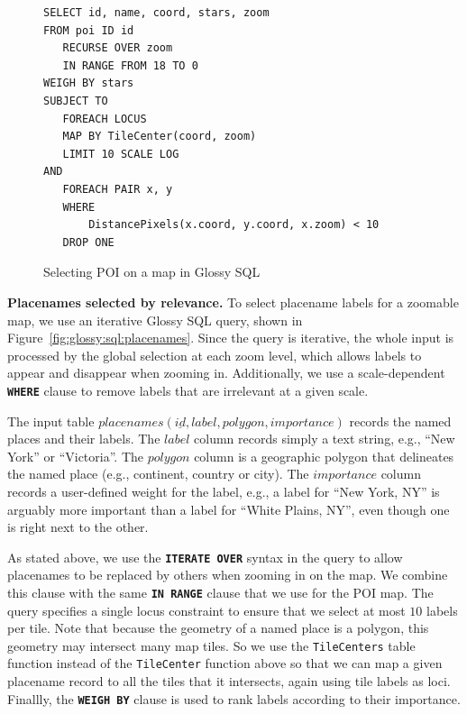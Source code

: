 \documentclass[11pt, oneside]{report}
\newcommand{\minisec}[1]{\noindent\textbf{#1.}}
\begin{document}
\begin{figure}[!t]
\begin{center}
\begin{lstlisting}
SELECT id, name, coord, stars, zoom
FROM poi ID id
   RECURSE OVER zoom 
   IN RANGE FROM 18 TO 0 
WEIGH BY stars
SUBJECT TO
   FOREACH LOCUS
   MAP BY TileCenter(coord, zoom)
   LIMIT 10 SCALE LOG
AND
   FOREACH PAIR x, y
   WHERE 
       DistancePixels(x.coord, y.coord, x.zoom) < 10
   DROP ONE
\end{lstlisting}
\vspace*{-2ex}
\caption{Selecting POI on a map in Glossy SQL}
\label{fig:glossy:sql:poi}
\end{center}
\vspace*{-5ex}
\end{figure}

\minisec{Placenames selected by relevance}
To select placename labels for a zoomable map, we use an iterative Glossy SQL query, shown in Figure~\ref{fig:glossy:sql:placenames}. Since the query is iterative, the whole input is processed by the global selection at each zoom level, which allows labels to appear and disappear when zooming in. Additionally, we use a scale-dependent \textbf{\texttt{WHERE}} clause to remove labels that are irrelevant at a given scale.

The input table $placenames(\underline{id}, label, polygon, importance)$ records the named places and their labels. The $label$ column records simply a text string, e.g., ``New York'' or ``Victoria''. The $polygon$ column is a geographic polygon that delineates the named place (e.g., continent, country or city). The $importance$ column records a user-defined weight for the label, e.g., a label for ``New York, NY'' is arguably more important than a label for ``White Plains, NY'', even though one is right next to the other.

As stated above, we use the \textbf{\texttt{ITERATE OVER}} syntax in the query to allow placenames to be replaced by others when zooming in on the map. We combine this clause with the same \textbf{\texttt{IN RANGE}} clause that we use for the POI map. The query specifies a single locus constraint to ensure that we select at most $10$ labels per tile. Note that because the geometry of a named place is a polygon, this geometry may intersect many map tiles. So we use the \texttt{TileCenters} table function instead of the \texttt{TileCenter} function above so that we can map a given placename record to all the tiles that it intersects, again using tile labels as loci.  
Finallly, the \textbf{\texttt{WEIGH BY}} clause is used to rank labels according to their importance. 
\end{document}
